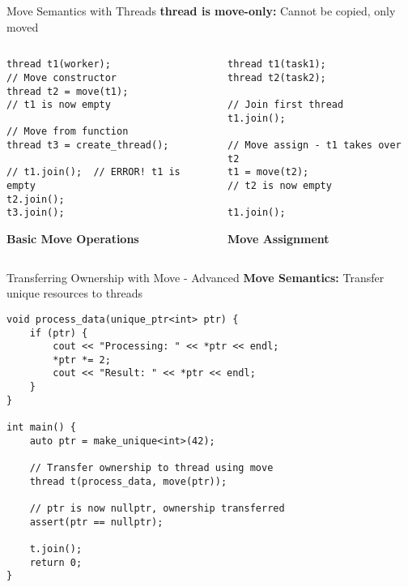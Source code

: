 \begin{frame}[fragile]{Move Semantics with Threads}
	\textbf{thread is move-only:} Cannot be copied, only moved

	\begin{columns}
		\begin{column}{0.5\textwidth}
			\begin{verbatim}
thread t1(worker);
// Move constructor
thread t2 = move(t1);
// t1 is now empty

// Move from function
thread t3 = create_thread();

// t1.join();  // ERROR! t1 is empty
t2.join();
t3.join();
			\end{verbatim}
			\textbf{Basic Move Operations}
		\end{column}
		\begin{column}{0.5\textwidth}
			\begin{verbatim}
thread t1(task1);
thread t2(task2);

// Join first thread
t1.join();

// Move assign - t1 takes over t2
t1 = move(t2);
// t2 is now empty

t1.join();
			\end{verbatim}
			\textbf{Move Assignment}
		\end{column}
	\end{columns}
\end{frame}

\begin{frame}[fragile]{Transferring Ownership with Move - Advanced}
	\textbf{Move Semantics:} Transfer unique resources to threads

	\begin{verbatim}
void process_data(unique_ptr<int> ptr) {
    if (ptr) {
        cout << "Processing: " << *ptr << endl;
        *ptr *= 2;
        cout << "Result: " << *ptr << endl;
    }
}

int main() {
    auto ptr = make_unique<int>(42);

    // Transfer ownership to thread using move
    thread t(process_data, move(ptr));

    // ptr is now nullptr, ownership transferred
    assert(ptr == nullptr);

    t.join();
    return 0;
}
	\end{verbatim}
\end{frame}

